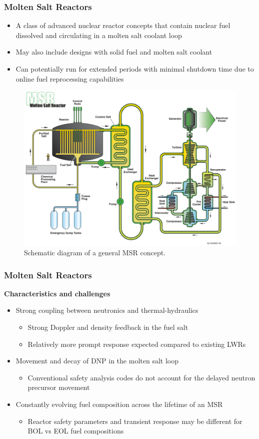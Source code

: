 \begin{frame}
	\frametitle{Molten Salt Reactors}
		\begin{itemize}
			\item A class of advanced nuclear reactor concepts that contain
			nuclear fuel dissolved and circulating in a molten salt coolant
			loop
			\item May also include designs with solid fuel and molten salt
			coolant
			\item Can potentially run for extended periods with minimal shutdown
			time due to online fuel reprocessing capabilities
		\end{itemize}
		\begin{figure}
			\centering
			\includegraphics[width=.5\textwidth]{./images/msr}
			\caption{Schematic diagram of a general \gls{MSR} concept.}
			\label{fig:msr}
		\end{figure}
\end{frame}

\begin{frame}
	\frametitle{Molten Salt Reactors}
		\textbf{Characteristics and challenges}
		\begin{itemize}
			\item Strong coupling between neutronics and thermal-hydraulics
			\begin{itemize}
				\item Strong Doppler and density feedback in the fuel salt
				\item Relatively more prompt response expected compared to
				existing LWRs
			\end{itemize}
			\item Movement and decay of \gls{DNP} in the molten
			salt loop
			\begin{itemize}
				\item Conventional safety analysis codes do not account for the
				delayed neutron precursor movement
			\end{itemize}
			\item Constantly evolving fuel composition across the lifetime of an
			\gls{MSR}
			\begin{itemize}
				\item Reactor safety parameters and transient response may be
				different for \gls{BOL} vs \gls{EOL} fuel compositions
			\end{itemize}
		\end{itemize}
\end{frame}
